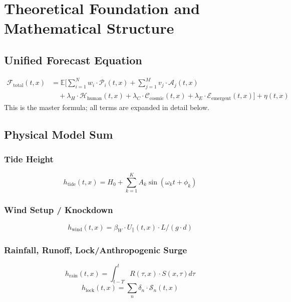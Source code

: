 \documentclass[12pt]{article}
\begin{document}
\section{Theoretical Foundation and Mathematical Structure}

\subsection{Unified Forecast Equation}
\begin{align}
\mathcal{F}_{\text{total}}(t, x) &= \mathbb{E} \Bigg[
    \sum_{i=1}^{N} w_i \cdot \mathcal{P}_i(t, x)
    + \sum_{j=1}^{M} v_j \cdot \mathcal{A}_j(t, x) \nonumber \\
    &\quad + \lambda_{H} \cdot \mathcal{H}_{\text{human}}(t, x)
    + \lambda_{C} \cdot \mathcal{C}_{\text{cosmic}}(t, x)
    + \lambda_{E} \cdot \mathcal{E}_{\text{emergent}}(t, x)
\Bigg] + \eta(t, x)
\label{eq:ftotal}
\end{align}
This is the master formula; all terms are expanded in detail below.

\subsection{Physical Model Sum}
\subsubsection{Tide Height}
\begin{equation}
h_{\text{tide}}(t, x) = H_0 + \sum_{k=1}^{K} A_k \sin(\omega_k t + \phi_k)
\end{equation}

\subsubsection{Wind Setup / Knockdown}
\begin{equation}
h_{\text{wind}}(t, x) = \beta_W \cdot U_{\parallel}(t, x) \cdot L / (g \cdot d)
\end{equation}

\subsubsection{Rainfall, Runoff, Lock/Anthropogenic Surge}
\begin{equation}
h_{\text{rain}}(t, x) = \int_{t-T}^{t} R(\tau, x) \cdot S(x, \tau) d\tau
\end{equation}
\begin{equation}
h_{\text{lock}}(t, x) = \sum_{n} \delta_n \cdot \mathcal{S}_n(t, x)
\end{equation}
\end{document}
